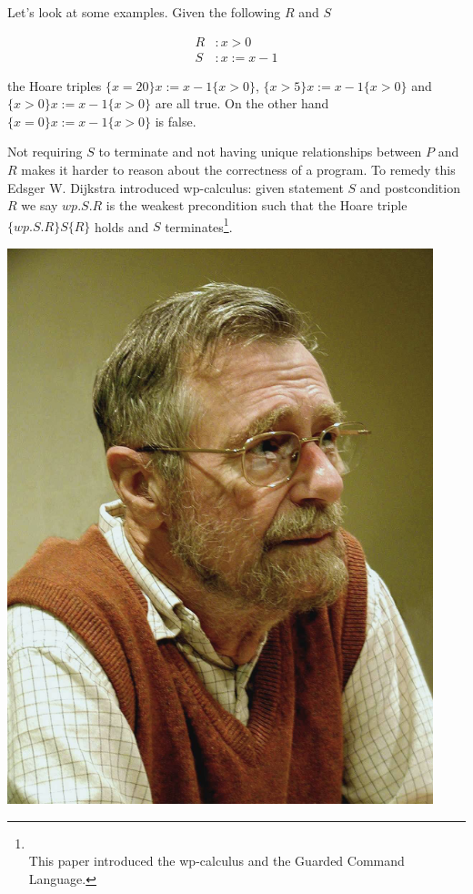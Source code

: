 Let's look at some examples. Given the following $R$ and $S$

\begin{align*}
R &: x > 0 \\
S &: x := x - 1
\end{align*}

the Hoare triples $\{x = 20\} x := x - 1 \{x > 0\}$, $\{x > 5\} x := x - 1 \{x > 0\}$ and $\{x > 0\} x := x - 1 \{x > 0\}$ are all true. On the other hand $\{x = 0\} x := x - 1 \{x > 0\}$ is false.

Not requiring $S$ to terminate and not having unique relationships between $P$ and $R$ makes it harder to reason about the correctness of a program. To remedy this Edsger W. Dijkstra introduced wp-calculus: given statement $S$ and postcondition $R$ we say $wp.S.R$ is the weakest precondition such that the Hoare triple $\{wp.S.R\} S \{R\}$ holds and $S$ terminates\footnote{
\\
 This paper introduced the wp-calculus and the Guarded Command Language.
}. 

\begin{marginfigure}
\includegraphics[scale=0.6]{dijkstra.png}
\end{marginfigure}

